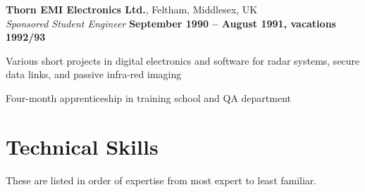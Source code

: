 \documentclass[margin = 0cm,line]{resume}
\begin{document}
\begin{resume}
    \textbf{Thorn EMI Electronics Ltd.}, Feltham, Middlesex, UK \vspace{2mm}\\\vspace{1mm}%
    \textsl{Sponsored Student Engineer} \hfill \textbf{September 1990 -- August 1991, vacations 1992/93}\vspace{-3mm}\\\vspace{-1mm}%
    \begin{list2}
        \item Various short projects in digital electronics and software for radar systems, 
                  secure data links, and passive infra-red imaging
        \item Four-month apprenticeship in training school and QA department
    \end{list2}\vspace{-1.5mm}


    \section{\mysidestyle Technical Skills} 

    These are listed in order of expertise from most expert to least familiar.


\end{resume}
\end{document}
